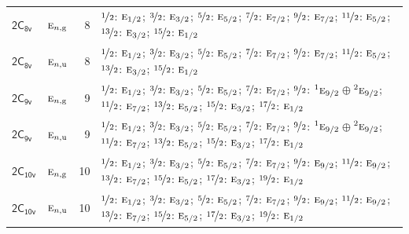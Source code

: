 \documentclass[10pt,a4paper]{article}
\numberwithin{equation}{section}
\newcommand{\grp}[1]{\mathsf{#1}}
\newcommand{\irr}[1]{\text{\normalfont\scshape #1}}
\newcommand{\conjpair}[1]{{}^{#1}}
\newcommand{\ptag}[1]{\mathrm{#1}}
\newlength{\fillwidth}\newlength{\cellwidth}\newlength{\colwidth}
\begin{document}
{\begin{longtable}{@{}llr>{\RaggedRight\arraybackslash}p{\fillwidth}@{}}
\href{2C8v.pdf}{$\grp{2C_{8v}}$} & $\irr{e}_{n,\ptag{g}}$ & 8 & $\nicefrac{1}{2}$: $\irr{e}_{1/2}$; $\nicefrac{3}{2}$: $\irr{e}_{3/2}$; $\nicefrac{5}{2}$: $\irr{e}_{5/2}$; $\nicefrac{7}{2}$: $\irr{e}_{7/2}$; $\nicefrac{9}{2}$: $\irr{e}_{7/2}$; $\nicefrac{11}{2}$: $\irr{e}_{5/2}$; $\nicefrac{13}{2}$: $\irr{e}_{3/2}$; $\nicefrac{15}{2}$: $\irr{e}_{1/2}$\\
\href{2C8v.pdf}{$\grp{2C_{8v}}$} & $\irr{e}_{n,\ptag{u}}$ & 8 & $\nicefrac{1}{2}$: $\irr{e}_{1/2}$; $\nicefrac{3}{2}$: $\irr{e}_{3/2}$; $\nicefrac{5}{2}$: $\irr{e}_{5/2}$; $\nicefrac{7}{2}$: $\irr{e}_{7/2}$; $\nicefrac{9}{2}$: $\irr{e}_{7/2}$; $\nicefrac{11}{2}$: $\irr{e}_{5/2}$; $\nicefrac{13}{2}$: $\irr{e}_{3/2}$; $\nicefrac{15}{2}$: $\irr{e}_{1/2}$\\
\href{2C9v.pdf}{$\grp{2C_{9v}}$} & $\irr{e}_{n,\ptag{g}}$ & 9 & $\nicefrac{1}{2}$: $\irr{e}_{1/2}$; $\nicefrac{3}{2}$: $\irr{e}_{3/2}$; $\nicefrac{5}{2}$: $\irr{e}_{5/2}$; $\nicefrac{7}{2}$: $\irr{e}_{7/2}$; $\nicefrac{9}{2}$: $\conjpair{1}\irr{e}_{9/2}$${}\oplus{}$$\conjpair{2}\irr{e}_{9/2}$; $\nicefrac{11}{2}$: $\irr{e}_{7/2}$; $\nicefrac{13}{2}$: $\irr{e}_{5/2}$; $\nicefrac{15}{2}$: $\irr{e}_{3/2}$; $\nicefrac{17}{2}$: $\irr{e}_{1/2}$\\
\href{2C9v.pdf}{$\grp{2C_{9v}}$} & $\irr{e}_{n,\ptag{u}}$ & 9 & $\nicefrac{1}{2}$: $\irr{e}_{1/2}$; $\nicefrac{3}{2}$: $\irr{e}_{3/2}$; $\nicefrac{5}{2}$: $\irr{e}_{5/2}$; $\nicefrac{7}{2}$: $\irr{e}_{7/2}$; $\nicefrac{9}{2}$: $\conjpair{1}\irr{e}_{9/2}$${}\oplus{}$$\conjpair{2}\irr{e}_{9/2}$; $\nicefrac{11}{2}$: $\irr{e}_{7/2}$; $\nicefrac{13}{2}$: $\irr{e}_{5/2}$; $\nicefrac{15}{2}$: $\irr{e}_{3/2}$; $\nicefrac{17}{2}$: $\irr{e}_{1/2}$\\
\href{2C10v.pdf}{$\grp{2C_{10v}}$} & $\irr{e}_{n,\ptag{g}}$ & 10 & $\nicefrac{1}{2}$: $\irr{e}_{1/2}$; $\nicefrac{3}{2}$: $\irr{e}_{3/2}$; $\nicefrac{5}{2}$: $\irr{e}_{5/2}$; $\nicefrac{7}{2}$: $\irr{e}_{7/2}$; $\nicefrac{9}{2}$: $\irr{e}_{9/2}$; $\nicefrac{11}{2}$: $\irr{e}_{9/2}$; $\nicefrac{13}{2}$: $\irr{e}_{7/2}$; $\nicefrac{15}{2}$: $\irr{e}_{5/2}$; $\nicefrac{17}{2}$: $\irr{e}_{3/2}$; $\nicefrac{19}{2}$: $\irr{e}_{1/2}$\\
\href{2C10v.pdf}{$\grp{2C_{10v}}$} & $\irr{e}_{n,\ptag{u}}$ & 10 & $\nicefrac{1}{2}$: $\irr{e}_{1/2}$; $\nicefrac{3}{2}$: $\irr{e}_{3/2}$; $\nicefrac{5}{2}$: $\irr{e}_{5/2}$; $\nicefrac{7}{2}$: $\irr{e}_{7/2}$; $\nicefrac{9}{2}$: $\irr{e}_{9/2}$; $\nicefrac{11}{2}$: $\irr{e}_{9/2}$; $\nicefrac{13}{2}$: $\irr{e}_{7/2}$; $\nicefrac{15}{2}$: $\irr{e}_{5/2}$; $\nicefrac{17}{2}$: $\irr{e}_{3/2}$; $\nicefrac{19}{2}$: $\irr{e}_{1/2}$\\

\end{longtable}}
\end{document}
